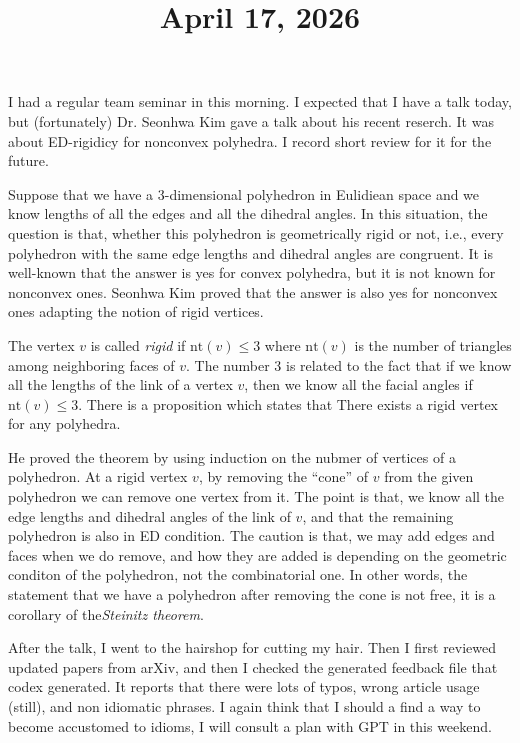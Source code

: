 \documentclass[11pt]{amsart}
\title{April 17, 2026}
\begin{document}
\maketitle

I had a regular team seminar in this morning.
I expected that I have a talk today, but (fortunately) Dr. Seonhwa Kim gave a talk about his recent reserch.
It was about ED-rigidicy for nonconvex polyhedra.
I record short review for it for the future.

Suppose that we have a 3-dimensional polyhedron in Eulidiean space and we know lengths of all the edges and all the dihedral angles.
In this situation, the question is that, whether this polyhedron is geometrically rigid or not, i.e., every polyhedron with the same edge lengths and dihedral angles are congruent.
It is well-known that the answer is yes for convex polyhedra, but it is not known for nonconvex ones.
Seonhwa Kim proved that the answer is also yes for nonconvex ones adapting the notion of rigid vertices.

The vertex $v$ is called \emph{rigid} if $\mathrm{nt}(v) \leq 3$ where $\mathrm{nt}(v)$ is the number of triangles among neighboring faces of $v$.
The number 3 is related to the fact that if we know all the lengths of the link of a vertex $v$, then we know all the facial angles if $\mathrm{nt}(v) \leq 3$.
There is a proposition which states that There exists a rigid vertex for any polyhedra.

He proved the theorem by using induction on the nubmer of vertices of a polyhedron.
At a rigid vertex $v$, by removing the ``cone'' of $v$ from the given polyhedron we can remove one vertex from it.
The point is that, we know all the edge lengths and dihedral angles of the link of $v$, and that the remaining polyhedron is also in ED condition.
The caution is that, we may add edges and faces when we do remove, and how they are added is depending on the geometric conditon of the polyhedron, not the combinatorial one.
In other words, the statement that we have a polyhedron after removing the cone is not free, it is a corollary of the\emph{Steinitz theorem}.

\par\vspace{1em}

After the talk, I went to the hairshop for cutting my hair. 
Then I first reviewed updated papers from arXiv, and then I checked the generated feedback file that codex generated.
It reports that there were lots of typos, wrong article usage (still), and non idiomatic phrases.
I again think that I should a find a way to become accustomed to idioms, I will consult a plan with GPT in this weekend.
\end{document}
